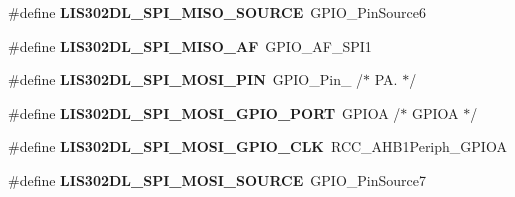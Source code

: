 \begin{DoxyCompactItemize}
\item 
\hypertarget{group___s_t_m32_f4___d_i_s_c_o_v_e_r_y___l_i_s302_d_l___exported___constants_ga5347118ef973738d89d4cdc35e5d75a6}{\#define {\bfseries L\-I\-S302\-D\-L\-\_\-\-S\-P\-I\-\_\-\-M\-I\-S\-O\-\_\-\-S\-O\-U\-R\-C\-E}~G\-P\-I\-O\-\_\-\-Pin\-Source6}\label{group___s_t_m32_f4___d_i_s_c_o_v_e_r_y___l_i_s302_d_l___exported___constants_ga5347118ef973738d89d4cdc35e5d75a6}

\item 
\hypertarget{group___s_t_m32_f4___d_i_s_c_o_v_e_r_y___l_i_s302_d_l___exported___constants_ga797c2138a65a3bb326c8917362affd45}{\#define {\bfseries L\-I\-S302\-D\-L\-\_\-\-S\-P\-I\-\_\-\-M\-I\-S\-O\-\_\-\-A\-F}~G\-P\-I\-O\-\_\-\-A\-F\-\_\-\-S\-P\-I1}\label{group___s_t_m32_f4___d_i_s_c_o_v_e_r_y___l_i_s302_d_l___exported___constants_ga797c2138a65a3bb326c8917362affd45}

\item 
\hypertarget{group___s_t_m32_f4___d_i_s_c_o_v_e_r_y___l_i_s302_d_l___exported___constants_ga87a99f9f94f4568c6f1d13bc991db52d}{\#define {\bfseries L\-I\-S302\-D\-L\-\_\-\-S\-P\-I\-\_\-\-M\-O\-S\-I\-\_\-\-P\-I\-N}~G\-P\-I\-O\-\_\-\-Pin\-\_                  /$\ast$ P\-A. $\ast$/}\label{group___s_t_m32_f4___d_i_s_c_o_v_e_r_y___l_i_s302_d_l___exported___constants_ga87a99f9f94f4568c6f1d13bc991db52d}

\item 
\hypertarget{group___s_t_m32_f4___d_i_s_c_o_v_e_r_y___l_i_s302_d_l___exported___constants_gad7ffd14197796df60d0c7ecf70a1c284}{\#define {\bfseries L\-I\-S302\-D\-L\-\_\-\-S\-P\-I\-\_\-\-M\-O\-S\-I\-\_\-\-G\-P\-I\-O\-\_\-\-P\-O\-R\-T}~G\-P\-I\-O\-A                       /$\ast$ G\-P\-I\-O\-A $\ast$/}\label{group___s_t_m32_f4___d_i_s_c_o_v_e_r_y___l_i_s302_d_l___exported___constants_gad7ffd14197796df60d0c7ecf70a1c284}

\item 
\hypertarget{group___s_t_m32_f4___d_i_s_c_o_v_e_r_y___l_i_s302_d_l___exported___constants_ga1a2748a4986c8ab8a72e1b127b374b38}{\#define {\bfseries L\-I\-S302\-D\-L\-\_\-\-S\-P\-I\-\_\-\-M\-O\-S\-I\-\_\-\-G\-P\-I\-O\-\_\-\-C\-L\-K}~R\-C\-C\-\_\-\-A\-H\-B1\-Periph\-\_\-\-G\-P\-I\-O\-A}\label{group___s_t_m32_f4___d_i_s_c_o_v_e_r_y___l_i_s302_d_l___exported___constants_ga1a2748a4986c8ab8a72e1b127b374b38}

\item 
\hypertarget{group___s_t_m32_f4___d_i_s_c_o_v_e_r_y___l_i_s302_d_l___exported___constants_ga7408d1c2dcce3545b78ac7f4bc7cbe2a}{\#define {\bfseries L\-I\-S302\-D\-L\-\_\-\-S\-P\-I\-\_\-\-M\-O\-S\-I\-\_\-\-S\-O\-U\-R\-C\-E}~G\-P\-I\-O\-\_\-\-Pin\-Source7}\label{group___s_t_m32_f4___d_i_s_c_o_v_e_r_y___l_i_s302_d_l___exported___constants_ga7408d1c2dcce3545b78ac7f4bc7cbe2a}


\end{DoxyCompactItemize}
